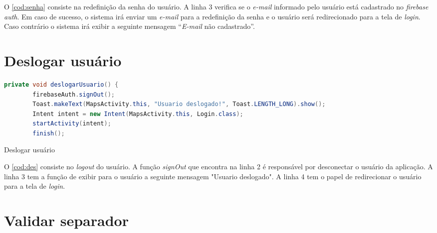 O \autoref{cod:senha} consiste na redefinição da senha do usuário. A linha 3 verifica se o \textit{e-mail} informado pelo usuário está cadastrado no \textit{firebase auth}. Em caso de sucesso, o sistema irá enviar um \textit{e-mail} para a redefinição da senha e o usuário será redirecionado para a tela de \textit{login}. Caso contrário o sistema irá exibir a seguinte mensagem “\textit{E-mail} não cadastrado”.

\section{Deslogar usuário}
\begin{codigo}[H]
	\begin{lstlisting}[language=Java]
private void deslogarUsuario() {
        firebaseAuth.signOut();
        Toast.makeText(MapsActivity.this, "Usuario deslogado!", Toast.LENGTH_LONG).show();
        Intent intent = new Intent(MapsActivity.this, Login.class);
        startActivity(intent);
        finish();
    \end{lstlisting}
    \caption{Deslogar usuário}
    \label{cod:des}
\end{codigo}

O \autoref{cod:des} consiste no \textit{logout} do usuário. A função \textit{signOut} que encontra na linha 2 é responsável por desconectar o usuário da aplicação. A linha 3 tem a função de exibir para o usuário a seguinte mensagem "Usuario deslogado". A linha 4 tem o papel de redirecionar o usuário para a tela de \textit{login}.

\section{Validar separador}

